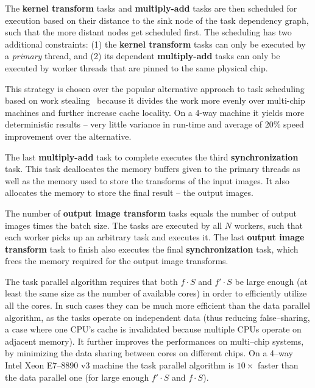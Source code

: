 \documentclass[conference]{./IEEEtran/IEEEtran}
\begin{document}
  The {\color{zblue}\bf kernel transform} tasks and {\color{zgreen}\bf
    multiply-add} tasks are then scheduled for execution based on
  their distance to the sink node of the task dependency graph, such
  that the more distant nodes get scheduled first.  The scheduling has
  two additional constraints: (1) the {\color{zblue}\bf kernel
    transform} tasks can only be executed by a \emph{primary} thread,
  and (2) its dependent {\color{zgreen}\bf multiply-add} tasks can
  only be executed by worker threads that are pinned to the same
  physical chip.

  This strategy is chosen over the popular alternative approach to
  task scheduling based on work stealing~\cite{reinders2007intel,
    willhalm2008putting} because it divides the work more evenly over
  multi-chip machines and further increase cache locality.  On a 4-way
  machine it yields more deterministic results -- very little variance
  in run-time and average of 20\% speed improvement over the
  alternative.

  The last {\color{zgreen}\bf multiply-add} task to complete executes
  the third {\color{zyellow}\bf synchronization} task.  This task
  deallocates the memory buffers given to the primary threads as well
  as the memory used to store the transforms of the input images.  It
  also allocates the memory to store the final result -- the output
  images.

  The number of {\color{zpurple}\bf output image transform} tasks
  equals the number of output images times the batch size.  The
  tasks are executed by all $N$ workers, such that each worker picks
  up an arbitrary task and executes it.  The last {\color{zpurple}\bf
    output image transform} task to finish also executes the final
  {\color{zyellow}\bf synchronization} task, which frees the memory
  required for the output image transforms.

  The task parallel algorithm requires that both $f \cdot S$ and $f'
  \cdot S$ be large enough (at least the same size as the number of
  available cores) in order to efficiently utilize all the cores.  In
  such cases they can be much more efficient than the data parallel
  algorithm, as the tasks operate on independent data (thus reducing
  false--sharing, a case where one CPU's cache is invalidated because
  multiple CPUs operate on adjacent memory).  It further improves the
  performances on multi--chip systems, by minimizing the data sharing
  between cores on different chips. On a 4--way Intel Xeon E7--8890 v3
  machine the task parallel algorithm is $10 \times$ faster than the
  data parallel one (for large enough $f' \cdot S$ and $f \cdot S$).
\end{document}
